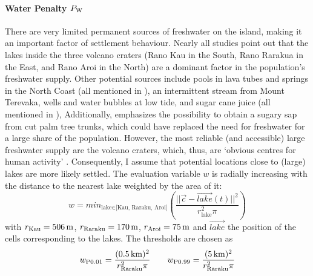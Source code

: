 \paragraph{Water Penalty $P_{\rm W}$}
There are very limited permanent sources of freshwater on the island, making it an important factor of settlement behaviour. 
Nearly all studies point out that the lakes inside the three volcano craters (Rano Kau in the South, Rano Rarakua in the East, and Rano Aroi in the North) are a dominant factor in the population's freshwater supply.
Other potential sources include pools in lava tubes and springs in the North Coast (all mentioned in \citet{Bahn2017}), an intermittent stream from Mount Terevaka, wells and water bubbles at low tide, and sugar cane juice (all mentioned in \citep{Diamond2011}), 
Additionally, \citet{Mieth2015} emphasizes the possibility to obtain a sugary sap from cut palm tree trunks, which could have replaced the need for freshwater for a large share of the population.
However, the most reliable (and accessible) large freshwater supply are the volcano craters, which, thus, are `obvious centres for human activity' \citep{Bahn2017}.
Consequently, I assume that potential locations close to (large) lakes are more likely settled.
The evaluation variable $w$ is radially increasing with the distance to the nearest lake weighted by the area of it:
\begin{equation}
	w = min_{\text{lake}\in \text{[Kau, Raraku, Aroi]}} \left( \frac{||
		 \vec{c}- \vec{lake}(t)||^2}{r_\text{lake}^2\pi} \right)
\end{equation}
with $r_\text{Kau} = 506\, \rm{m}$, $r_\text{Raraku} = 170\, \rm{m}$, $r_\text{Aroi} = 75\, \rm{m}$ and $\vec{lake}$ the position of the cells corresponding to the lakes.
The thresholds are chosen as 
\begin{equation}
w_{\rm P0.01} = \frac{(0.5\, {\rm km})^2}{r_\text{Raraku}^2\pi} \qquad
 w_{\rm P0.99}=\frac{(5\, {\rm km})^2}{r_\text{Raraku}^2\pi}
\end{equation} 
